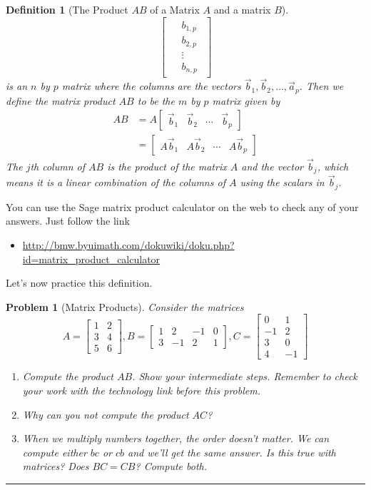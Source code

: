 \documentclass[letterpaper,oneside]{book}%
\theoremstyle{plain}
\theoremstyle{box}
\newtheorem{definition}[theorem]{Definition}
\theoremstyle{problem}
\newtheorem{problemnum}{Problem}[chapter]
\newenvironment{problem}[1][]{\begin{problemnum}[#1]}{\end{problemnum}\nopagebreak\hrule\bigskip}
\newcommand{\nvec}[1]{\begin{matrix} #1 \end{matrix}}
\begin{document}
\begin{definition}[The Product $AB$ of a Matrix $A$ and a matrix $B$]
$$\begin{bmatrix}
&\nvec{b_{1,p}\\b_{2,p}\\\vdots\\b_{n,p}}
\end{bmatrix}$$
is an $n$ by $p$ matrix where the columns are the vectors $\vec b_1, \vec b_2,\ldots, \vec a_p$.
Then we define the matrix product $AB$ to be the $m$ by $p$ matrix given by
\begin{align*}
AB 
&= A\begin{bmatrix}\vec b_1&\vec b_2&\cdots& \vec b_p\end{bmatrix} \\
&= \begin{bmatrix}A\vec b_1 & A\vec b_2 & \cdots & A\vec b_p\end{bmatrix}
\end{align*}
The $j$th column of $AB$ is the product of the matrix $A$ and the vector $\vec b_j$, which means it is a linear combination of the columns of $A$ using the scalars in $\vec b_{j}$.   
\end{definition}

You can use the Sage matrix product calculator on the web to check any of your answers. Just follow the link
\begin{itemize}
 \item \href{http://bmw.byuimath.com/dokuwiki/doku.php?id=matrix\_product\_calculator}{http://bmw.byuimath.com/dokuwiki/doku.php?id=matrix\_product\_calculator}
\end{itemize}
Let's now practice this definition.
\begin{problem}[Matrix Products]\label{matrix product problem}
 Consider the matrices
$$
A=
\begin{bmatrix}
 1&2\\3&4\\5&6
\end{bmatrix},
B=
\begin{bmatrix}
 1&2&-1&0\\3&-1&2&1
\end{bmatrix},
C=
\begin{bmatrix}
 0&1\\-1&2\\3&0\\4&-1
\end{bmatrix}
$$
\begin{enumerate}
 \item Compute the product $AB$.  Show your intermediate steps.  Remember to check your work with the technology link before this problem.
 \item Why can you not compute the product $AC$? 
 \item When we multiply numbers together, the order doesn't matter.  We can compute either $bc$ or $cb$ and we'll get the same answer.  Is this true with matrices?  Does $BC=CB$? Compute both.
\end{enumerate}

\end{problem}
\end{document}

